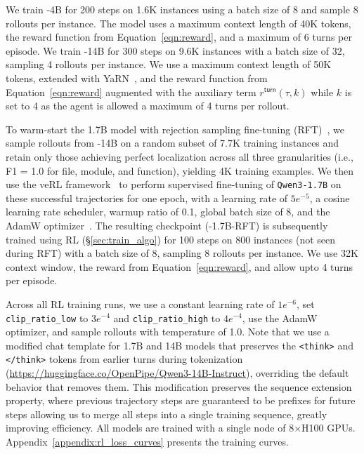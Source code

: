 We train \methodname-4B for 200 steps on 1.6K instances using a batch size of 8 and sample 8 rollouts per instance. The model uses a maximum context length of 40K tokens, the reward function from Equation~\ref{eqn:reward}, and a maximum of 6 turns per episode. We train \methodname-14B for 300 steps on 9.6K instances with a batch size of 32, sampling 4 rollouts per instance. We use a maximum context length of 50K tokens, extended with YaRN~\citep{peng2026yarnefficientcontextwindow}, and the reward function from Equation~\ref{eqn:reward} augmented with the auxiliary term $r^{\mathsf{turn}}(\tau, k)$ while $k$ is set to 4 as the agent is allowed a maximum of 4 turns per rollout.

To warm-start the 1.7B model with rejection sampling fine-tuning (RFT)~\citep{yuan2023scalingrelationshiplearningmathematical}, we sample rollouts from \methodname-14B on a random subset of 7.7K training instances and retain only those achieving perfect localization across all three granularities (i.e., F1 = 1.0 for file, module, and function), yielding 4K training examples. We then use the veRL framework~\citep{Sheng_2025} to perform supervised fine-tuning of \texttt{Qwen3-1.7B} on these successful trajectories for one epoch, with a learning rate of $5e^{-5}$, a cosine learning rate scheduler, warmup ratio of 0.1, global batch size of 8, and the AdamW optimizer~\citep{loshchilov2019decoupledweightdecayregularization}. The resulting checkpoint (\methodname-1.7B-RFT) is subsequently trained using RL (\S\ref{sec:train_algo}) for 100 steps on 800 instances (not seen during RFT) with a batch size of 8, sampling 8 rollouts per instance. We use 32K context window, the reward from Equation~\ref{eqn:reward}, and allow upto 4 turns per episode.

Across all \methodname RL training runs, we use a constant learning rate of $1e^{-6}$, set \texttt{clip\_ratio\_low} to $3e^{-4}$ and \texttt{clip\_ratio\_high} to $4e^{-4}$, use the AdamW optimizer, and sample rollouts with temperature of 1.0. Note that we use a modified chat template for 1.7B and 14B models that preserves the \texttt{<think>} and \texttt{</think>} tokens from earlier turns during tokenization (\url{https://huggingface.co/OpenPipe/Qwen3-14B-Instruct}), overriding the default behavior that removes them. This modification preserves the sequence extension property, where previous trajectory steps are guaranteed to be prefixes for future steps allowing us to merge all steps into a single training sequence, greatly improving efficiency. All \methodname models are trained with a single node of 8$\times$H100 GPUs. Appendix~\ref{appendix:rl_loss_curves} presents the training curves.

